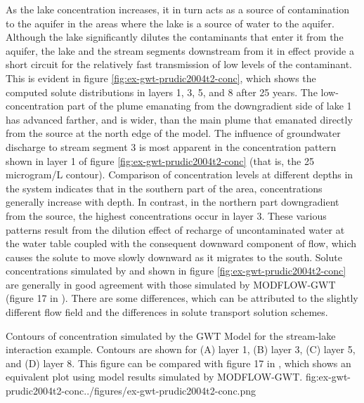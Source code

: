 As the lake concentration increases, it in turn acts as a source of contamination to the aquifer in the areas where the lake is a source of water to the aquifer. Although the lake significantly dilutes the contaminants that enter it from the aquifer, the lake and the stream segments downstream from it in effect provide a short circuit for the relatively fast transmission of low levels of the contaminant. This is evident in figure \ref{fig:ex-gwt-prudic2004t2-conc}, which shows the computed solute distributions in layers 1, 3, 5, and 8 after 25 years. The low-concentration part of the plume emanating from the downgradient side of lake 1 has advanced farther, and is wider, than the main plume that emanated directly from the source at the north edge of the model. The influence of groundwater discharge to stream segment 3 is most apparent in the concentration pattern shown in layer 1 of figure \ref{fig:ex-gwt-prudic2004t2-conc} (that is, the 25 microgram/L contour). Comparison of concentration levels at different depths in the system indicates that in the southern part of the area, concentrations generally increase with depth. In contrast, in the northern part downgradient from the source, the highest concentrations occur in layer 3. These various patterns result from the dilution effect of recharge of uncontaminated water at the water table coupled with the consequent downward component of flow, which causes the solute to move slowly downward as it migrates to the south.  Solute concentrations simulated by \mf and shown in figure \ref{fig:ex-gwt-prudic2004t2-conc} are generally in good agreement with those simulated by MODFLOW-GWT (figure 17 in \cite{modflowsfr1pack}).  There are some differences, which can be attributed to the slightly different flow field and the differences in solute transport solution schemes.

\begin{StandardFigure}{
                                     Contours of concentration simulated by the \mf GWT Model for the stream-lake interaction example.  Contours are shown for (A) layer 1, (B) layer 3, (C) layer 5, and (D) layer 8. This figure can be compared with figure 17 in \cite{modflowsfr1pack}, which shows an equivalent plot using model results simulated by MODFLOW-GWT.
                                     }{fig:ex-gwt-prudic2004t2-conc}{../figures/ex-gwt-prudic2004t2-conc.png}
\end{StandardFigure}            

